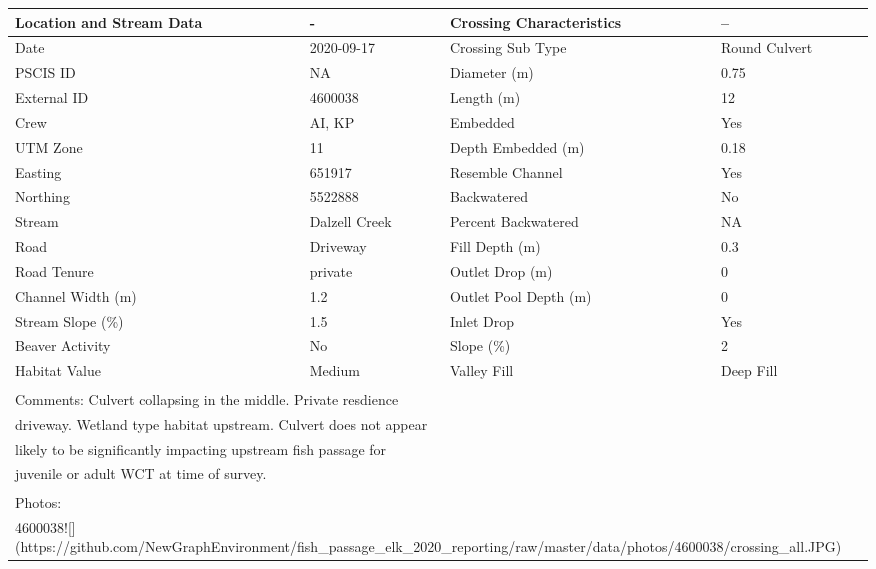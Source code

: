 \documentclass[
]{book}
\begin{document}
\begin{tabular}{l|l|l|l}
\hline
Location and Stream Data & - & Crossing Characteristics & --\\
\hline
Date & 2020-09-17 & Crossing Sub Type & Round Culvert\\
\hline
PSCIS ID & NA & Diameter (m) & 0.75\\
\hline
External ID & 4600038 & Length (m) & 12\\
\hline
Crew & AI, KP & Embedded & Yes\\
\hline
UTM Zone & 11 & Depth Embedded (m) & 0.18\\
\hline
Easting & 651917 & Resemble Channel & Yes\\
\hline
Northing & 5522888 & Backwatered & No\\
\hline
Stream & Dalzell Creek & Percent Backwatered & NA\\
\hline
Road & Driveway & Fill Depth (m) & 0.3\\
\hline
Road Tenure & private & Outlet Drop (m) & 0\\
\hline
Channel Width (m) & 1.2 & Outlet Pool Depth (m) & 0\\
\hline
Stream Slope (\%) & 1.5 & Inlet Drop & Yes\\
\hline
Beaver Activity & No & Slope (\%) & 2\\
\hline
Habitat Value & Medium & Valley Fill & Deep Fill\\
\hline
\multicolumn{4}{l}{\textsuperscript{} Comments: Culvert collapsing in the middle. Private resdience}\\
\multicolumn{4}{l}{driveway. Wetland type habitat upstream. Culvert does not appear}\\
\multicolumn{4}{l}{likely to be significantly impacting upstream fish passage for}\\
\multicolumn{4}{l}{juvenile or adult WCT at time of survey.}\\
\multicolumn{4}{l}{\textsuperscript{} Photos:}\\
\multicolumn{4}{l}{4600038![](https://github.com/NewGraphEnvironment/fish\_passage\_elk\_2020\_reporting/raw/master/data/photos/4600038/crossing\_all.JPG)}\\
\end{tabular}
\end{document}
